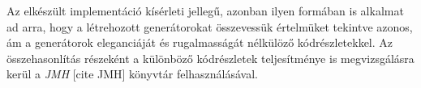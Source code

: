 Az elkészült implementáció kísérleti jellegű, azonban ilyen formában is alkalmat ad arra, hogy a létrehozott generátorokat összevessük értelmüket tekintve azonos, ám a generátorok eleganciáját és rugalmasságát nélkülöző kódrészletekkel. Az összehasonlítás részeként a különböző kódrészletek teljesítménye is megvizsgálásra kerül a \textit{JMH} [cite JMH] könyvtár felhasználásával.
